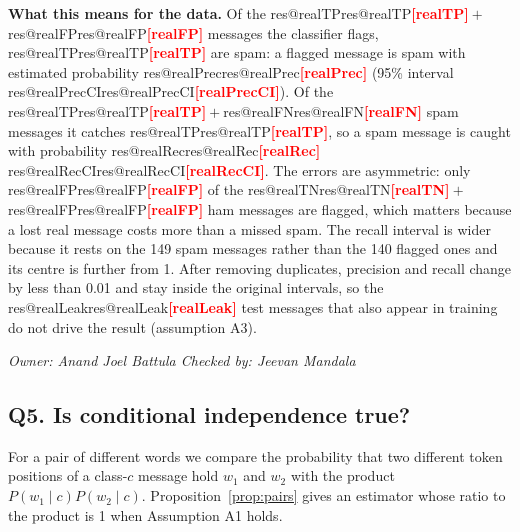 \documentclass[11pt]{article}
\makeatletter
\newcommand{\fillin}[1]{\textcolor{red}{\textbf{[#1]}}}
\newcommand{\res}[1]{\ifcsname res@#1\endcsname\csname res@#1\endcsname\else\fillin{#1}\fi}
\newcommand{\owner}[2]{\par\noindent\textit{Owner: #1 \hfill Checked by: #2}\par\medskip}
\theoremstyle{plain}
\makeatother
\begin{document}
\textbf{What this means for the data.} Of the \res{realTP}${}+{}$\res{realFP} messages the classifier
flags, \res{realTP} are spam: a flagged message is spam with estimated probability \res{realPrec}
(95\% interval \res{realPrecCI}). Of the \res{realTP}${}+{}$\res{realFN} spam messages it catches
\res{realTP}, so a spam message is caught with probability \res{realRec} \res{realRecCI}. The errors are
asymmetric: only \res{realFP} of the \res{realTN}${}+{}$\res{realFP} ham messages are flagged, which
matters because a lost real message costs more than a missed spam. The recall interval is wider
because it rests on the 149 spam messages rather than the 140 flagged ones and its centre is further
from 1. After removing duplicates, precision and recall change by less than 0.01 and stay inside the
original intervals, so the \res{realLeak} test messages that also appear in training do not drive the
result (assumption A3).
\owner{Anand Joel Battula}{Jeevan Mandala}

\subsection{Q5. Is conditional independence true?}\label{sec:q5}
For a pair of different words we compare the probability that two different token positions of a
class-$c$ message hold $w_1$ and $w_2$ with the product $P(w_1\mid c)P(w_2\mid c)$. Proposition~\ref{prop:pairs}
gives an estimator whose ratio to the product is 1 when Assumption A1 holds.
\end{document}

